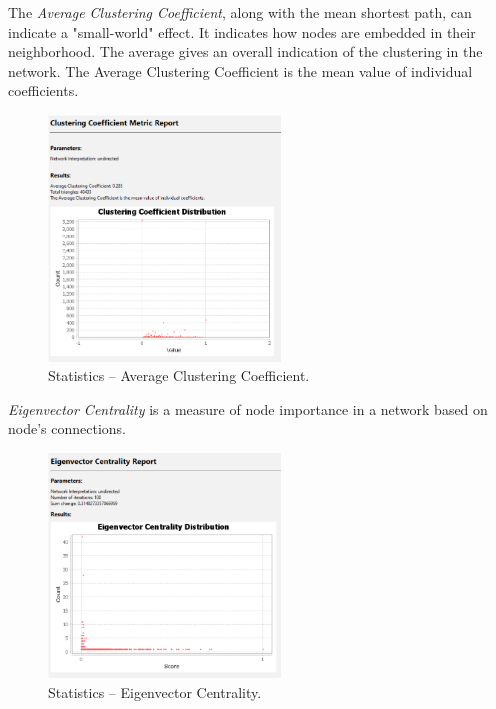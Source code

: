 \documentclass[12pt, a4paper]{article}
\begin{document}
The \textit{Average Clustering Coefficient}, along with the mean shortest path, can indicate a "small-world" effect. It indicates how nodes are embedded in their neighborhood. The average gives an overall indication of the clustering in the network. The Average Clustering Coefficient is the mean value of individual coefficients.
\begin{figure}[!h]
\centering
\includegraphics[width=0.55\textwidth]{s6p10.png}
\caption{Statistics -- Average Clustering Coefficient.}
\end{figure}

\textit{Eigenvector Centrality} is a measure of node importance in a network based on node's connections.
\begin{figure}[!h]
\centering
\includegraphics[width=0.55\textwidth]{s6p11.png}
\caption{Statistics -- Eigenvector Centrality.}
\end{figure}

\newpage
\end{document}
